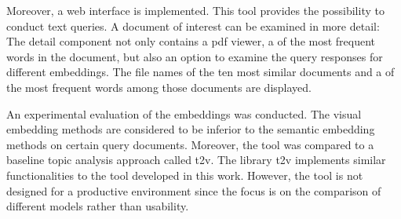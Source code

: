 Moreover, a web interface is implemented.
This tool provides the possibility to conduct text queries.
A document of interest can be examined in more detail:
The detail component not only contains a \ac{pdf} viewer, 
a \wordcloud{} of the most frequent words in the document, but also an option to examine the query responses for different embeddings.
The file names of the ten most similar documents and a \wordcloud{} of the most frequent words among those documents are displayed.

An experimental evaluation of the embeddings was conducted.
The visual embedding methods are considered to be inferior to the semantic embedding methods on certain query documents.
Moreover, the tool was compared to a baseline topic analysis approach called \ac{t2v}.
The library \ac{t2v} implements similar functionalities to the tool developed in this work.
However, the tool is not designed for a productive environment since the focus is on the comparison of different models rather than usability.